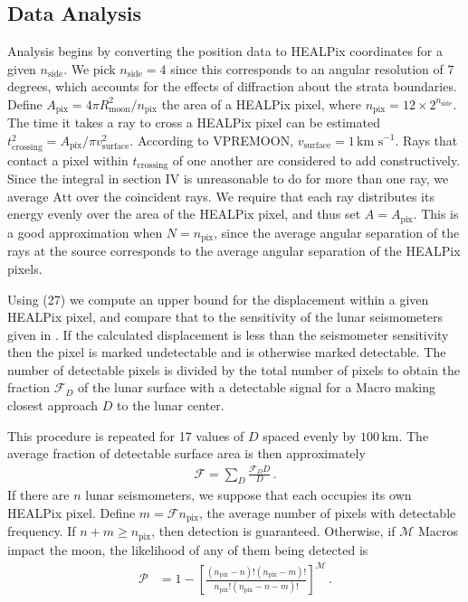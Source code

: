 \documentclass[prd,reprint,10pt]{revtex4-1}
\newcommand*\scr[1]{\mathscr{#1}}
\newcommand*\te[1]{\text{#1}}
\newcommand*\ps[1]{\left[#1\right]}
\newcommand*\f[2]{\frac{#1}{#2}}
\begin{document}
\subsection{Data Analysis}
Analysis begins by converting the position data to HEALPix coordinates for a given $n_\te{side}$. We pick $n_\te{side} = 4$ since this corresponds to an angular resolution of 7 degrees, which accounts for the effects of diffraction about the strata boundaries. Define $A_\te{pix} = 4\pi R_\te{moon}^2/n_\te{pix}$ the area of a HEALPix pixel, where $n_\te{pix} = 12\times 2^{n_{\te{side}}}$. The time it takes a ray to cross a HEALPix pixel can be estimated $t_\te{crossing}^2 = A_\te{pix}/\pi v_\te{surface}^2$. According to VPREMOON, $v_\te{surface} = 1\,\te{km s}^{-1}$. Rays that contact a pixel within $t_\te{crossing}$ of one another are considered to add constructively. Since the integral in section IV is unreasonable to do for more than one ray, we average $\te{Att}$ over the coincident rays. We require that each ray distributes its energy evenly over the area of the HEALPix pixel, and thus set $A = A_\te{pix}$. This is a good approximation when $N=n_\te{pix}$, since the average angular separation of the rays at the source corresponds to the average angular separation of the HEALPix pixels.

Using (27) we compute an upper bound for the displacement within a given HEALPix pixel, and compare that to the sensitivity of the lunar seismometers given in \cite{latham1973lunar}. If the calculated displacement is less than the seismometer sensitivity then the pixel is marked undetectable and is otherwise marked detectable. The number of detectable pixels is divided by the total number of pixels to obtain the fraction $\scr F_D$ of the lunar surface with a detectable signal for a Macro making closest approach $D$ to the lunar center.

This procedure is repeated for 17 values of $D$ spaced evenly by $100\,\te{km}$. The average fraction of detectable surface area is then approximately
\begin{align}
\scr F = \sum_D\f{\scr F_D D}{D}\,.
\end{align}
If there are $n$ lunar seismometers, we suppose that each occupies its own HEALPix pixel. Define $m = \scr Fn_\te{pix}$, the average number of pixels with detectable frequency. If $n+m\geq n_\te{pix}$, then detection is guaranteed. Otherwise, if $\scr M$ Macros impact the moon, the likelihood of any of them being detected is
\begin{align}
\scr P &= 1-\ps{\f{(n_\te{pix}-n)!(n_\te{pix}-m)!}{n_\te{pix}!(n_\te{pix}-n-m)!}}^{\scr M}\,.
\end{align}
\end{document}
